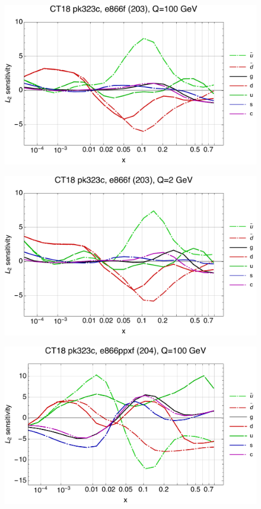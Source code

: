 \documentclass[10pt,aps,prd,floatfix,titlepage]{revtex4}
\begin{document}
\clearpage
\begin{figure}
\includegraphics[width=\textwidth,height=0.44\textheight,keepaspectratio]{1/203_ct18nn_L2_q100_Sf_1.pdf}
\caption{}
\end{figure}
\begin{figure}
\includegraphics[width=\textwidth,height=0.44\textheight,keepaspectratio]{1/203_ct18nn_L2_q2_Sf_1.pdf}
\caption{}
\end{figure}
\clearpage
\begin{figure}
\includegraphics[width=\textwidth,height=0.44\textheight,keepaspectratio]{1/204_ct18nn_L2_q100_Sf_1.pdf}
\caption{}
\end{figure}
\end{document}
